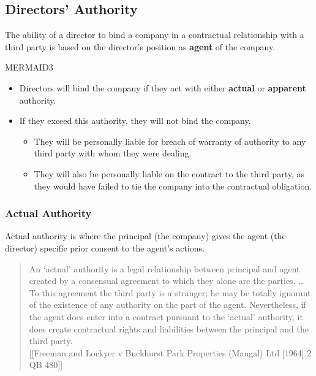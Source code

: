 \documentclass[
]{article}
\newenvironment{Shaded}{}{}
\newcommand{\NormalTok}[1]{#1}
\providecommand{\tightlist}{%
  \setlength{\itemsep}{0pt}\setlength{\parskip}{0pt}}
\begin{document}
\hypertarget{directors-authority}{%
\subsection{Directors' Authority}\label{directors-authority}}

The ability of a director to bind a company in a contractual
relationship with a third party is based on the director's position as
\textbf{agent} of the company.

MERMAID3

\begin{itemize}
\tightlist
\item
  Directors will bind the company if they act with either
  \textbf{actual} or \textbf{apparent} authority.
\item
  If they exceed this authority, they will not bind the company.

  \begin{itemize}
  \tightlist
  \item
    They will be personally liable for breach of warranty of authority
    to any third party with whom they were dealing.
  \item
    They will also be personally liable on the contract to the third
    party, as they would have failed to tie the company into the
    contractual obligation.
  \end{itemize}
\end{itemize}

\hypertarget{actual-authority}{%
\subsubsection{Actual Authority}\label{actual-authority}}

\begin{Shaded}
\begin{Highlighting}[]
\NormalTok{Actual authority is where the principal (the company) gives the agent (the director) specific prior consent to the agent’s actions.}
\end{Highlighting}
\end{Shaded}

\begin{quote}
An `actual' authority is a legal relationship between principal and
agent created by a consensual agreement to which they alone are the
parties. \ldots{} To this agreement the third party is a stranger; he
may be totally ignorant of the existence of any authority on the part of
the agent. Nevertheless, if the agent does enter into a contract
pursuant to the `actual' authority, it does create contractual rights
and liabilities between the principal and the third party.\\
{[}{[}Freeman and Lockyer v Buckhurst Park Properties (Mangal) Ltd
{[}1964{]} 2 QB 480{]}{]}
\end{quote}
\end{document}
